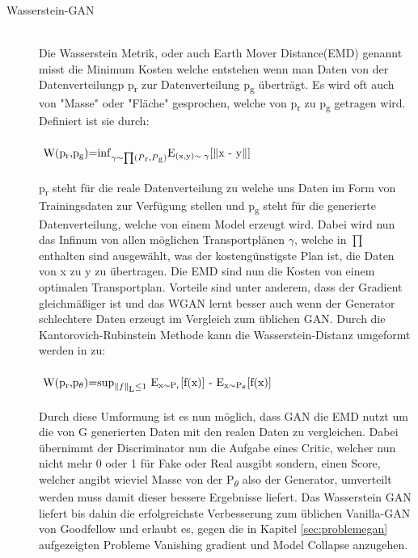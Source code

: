 \documentclass{llncs}
\begin{document}
\begin{description}
\item[Wasserstein-GAN]
~\\
Die Wasserstein Metrik, oder auch Earth Mover Distance(EMD) genannt misst die Minimum Kosten welche entstehen wenn man Daten von der Datenverteilungp p\textsubscript{r} zur Datenverteilung p\textsubscript{g} überträgt. Es wird oft auch von "Masse" oder "Fläche" gesprochen, welche von p\textsubscript{r} zu p\textsubscript{g} getragen wird. Definiert ist sie durch:
\\\\
\begin{math} 
$
W(p\textsubscript{r},p\textsubscript{g})=$\inf_{\gamma\sim\prod(P\textsubscript{r},P\textsubscript{g})}$E\textsubscript{(x,y)$\sim\gamma$}[$\parallel$x - y$\parallel$]
$
\end{math}
\\\\
p\textsubscript{r} steht für die reale Datenverteilung zu welche uns Daten im Form von Trainingsdaten zur Verfügung stellen und p\textsubscript{g} steht für die generierte Datenverteilung, welche von einem Model erzeugt wird. Dabei wird nun das Infinum von allen möglichen Transportplänen $\gamma$, welche in $\prod$ enthalten sind ausgewählt, was der kostengünstigste Plan ist, die Daten von x zu y zu übertragen. Die EMD sind nun die Kosten von einem optimalen Transportplan. Vorteile sind unter anderem, dass der Gradient gleichmäßiger ist und das WGAN lernt besser auch wenn der Generator schlechtere Daten erzeugt im Vergleich zum üblichen GAN\cite{wasser}. Durch die Kantorovich-Rubinstein Methode kann die Wasserstein-Distanz umgeformt werden in zu:
\\\\
\begin{math} 
$
W(p\textsubscript{r},p\textsubscript{$\theta$})=$\sup_{\parallel f \parallel \textsubscript{L}\leq 1}$ E\textsubscript{x$\sim$P\textsubscript{r}}[f(x)] - E\textsubscript{x$\sim$P\textsubscript{$\theta$}}[f(x)]
$
\end{math}
\\\\
Durch diese Umformung ist es nun möglich, dass GAN die EMD nutzt um die von G generierten Daten mit den realen Daten zu vergleichen. Dabei übernimmt der Discriminator nun die Aufgabe eines Critic, welcher nun nicht mehr 0 oder 1 für Fake oder Real ausgibt sondern, einen Score, welcher angibt wieviel Masse von der P\textsubscript{$\theta$} also der Generator, umverteilt werden muss damit dieser bessere Ergebnisse liefert. Das Wasserstein GAN liefert bis dahin die erfolgreichste Verbesserung zum üblichen Vanilla-GAN von Goodfellow und erlaubt es, gegen die in Kapitel \ref{sec:problemegan} aufgezeigten Probleme Vanishing gradient und Model Collapse anzugehen\cite{wasser}. 
\end{description}
\newpage
\end{document}
